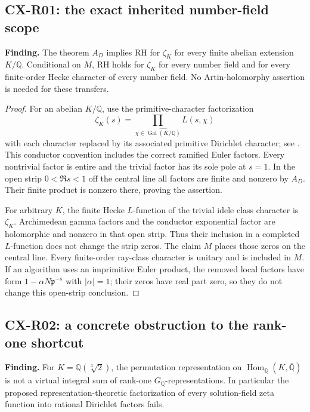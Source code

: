 \documentclass[11pt,a4paper]{article}
\begin{document}
\subsection{CX-R01: the exact inherited number-field scope}
\label{finding:R01}

\textbf{Finding.} The theorem $A_D$ implies RH for $\zeta_K$ for every finite
abelian extension $K/\mathbb Q$.  Conditional on $M$, RH holds for $\zeta_K$
for every number field and for every finite-order Hecke character of every
number field.  No Artin-holomorphy assertion is needed for these transfers.

\begin{proof}
For an abelian $K/\mathbb Q$, use the primitive-character factorization
\[
 \zeta_K(s)=\prod_{\chi\in\widehat{\operatorname{Gal}(K/\mathbb Q)}}L(s,\chi)
\]
with each character replaced by its associated primitive Dirichlet character;
see \cite[Theorem~4.3, p.~33]{Washington1997}.  This conductor convention
includes the correct ramified Euler factors.  Every nontrivial factor is
entire and the trivial factor has its sole pole at $s=1$.  In the open strip
$0<\Re s<1$ off the central line all factors are finite and nonzero by $A_D$.
Their finite product is nonzero there, proving the assertion.

For arbitrary $K$, the finite Hecke $L$-function of the trivial idele class
character is $\zeta_K$.  Archimedean gamma factors and the conductor
exponential factor are holomorphic and nonzero in that open strip.  Thus
their inclusion in a completed $L$-function does not change the strip zeros.
The claim $M$ places those zeros on the central line.  Every finite-order
ray-class character is unitary and is included in $M$.  If an algorithm uses
an imprimitive Euler product, the removed local factors have form
$1-\alpha N\mathfrak p^{-s}$ with $|\alpha|=1$; their zeros have real part
zero, so they do not change this open-strip conclusion.
\end{proof}

\subsection{CX-R02: a concrete obstruction to the rank-one shortcut}
\label{finding:R02}

\textbf{Finding.} For $K=\mathbb Q(\sqrt[3]{2})$, the permutation
representation on $\operatorname{Hom}_{\mathbb Q}(K,\overline{\mathbb Q})$
is not a virtual integral sum of rank-one $G_{\mathbb Q}$-representations.
In particular the proposed representation-theoretic factorization of every
solution-field zeta function into rational Dirichlet factors fails.
\end{document}
